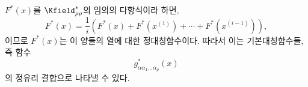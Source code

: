 
$F^*(x)$를 $\Kfield^*_{\rho\rho}$의 임의의 다항식이라 하면,
\[
F^*(x)=\frac1i\left(F^*(x)+F^*(x^{(1)})+\cdots+F^*(x^{(i-1)})\right),
\]
이므로 $F^*(x)$는 이 양들의 열에 대한 정대칭함수이다. 따라서 이는 기본대칭함수들, 즉 함수
\[
g^*_{\alpha\alpha_1\ldots\alpha_\rho}(x)
\]
의 정유리 결합으로 나타낼 수 있다.
